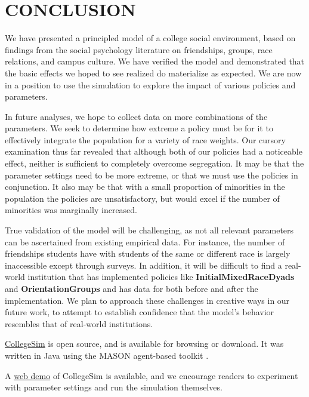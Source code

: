 
\section{CONCLUSION}
\label{sec:discussion}

We have presented a principled model of a college social environment, based on
findings from the social psychology literature on friendships, groups, race
relations, and campus culture. We have verified the model and demonstrated
that the basic effects we hoped to see realized do materialize as expected. We
are now in a position to use the simulation to explore the impact of various
policies and parameters.

In future analyses, we hope to collect data on more combinations of the
parameters. We seek to determine how extreme a policy must be for it to
effectively integrate the population for a variety of race weights. Our
cursory examination thus far revealed that although both of our policies had a
noticeable effect, neither is sufficient to completely overcome segregation.
It may be that the parameter settings need to be more extreme, or that we must
use the policies in conjunction. It also may be that with a small proportion
of minorities in the population the policies are unsatisfactory, but would
excel if the number of minorities was marginally increased. 

True validation of the model will be challenging, as not all relevant
parameters can be ascertained from existing empirical data. For instance, the
number of friendships students have with students of the same or different
race is largely inaccessible except through surveys. In addition, it will be
difficult to find a real-world institution that has implemented policies like
\textbf{InitialMixedRaceDyads} and \textbf{OrientationGroups} and has data for
both before and after the implementation. We plan to approach these challenges
in creative ways in our future work, to attempt to establish confidence that
the model's behavior resembles that of real-world institutions.

\href{https://github.com/WheezePuppet/CollegeSim}{CollegeSim} \cite{CollegeSim} is open source, and is available for browsing or download. It was written in Java
using the MASON agent-based toolkit \cite{luke_mason:_2005}.

A \href{http://caladan.umw.edu:22223}{web demo} \cite{WebDemo} of CollegeSim is available, and we encourage readers to experiment
with parameter settings and run the simulation themselves.

